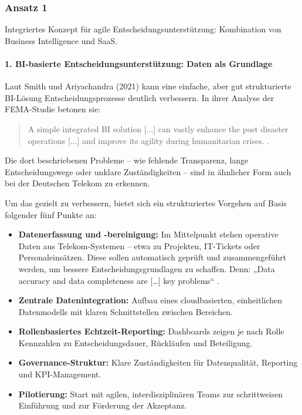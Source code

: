 \documentclass[12pt,a4paper]{article}
\begin{document}
\subsubsection{Ansatz 1}
Integriertes Konzept für agile Entscheidungsunterstützung: Kombination von Business Intelligence und SaaS.

\paragraph{1. BI-basierte Entscheidungsunterstützung: Daten als Grundlage}

Laut Smith und Ariyachandra (2021) kann eine einfache, aber gut strukturierte BI-Lösung Entscheidungsprozesse deutlich verbessern. In ihrer Analyse der FEMA-Studie betonen sie:

\begin{quote}
	A simple integrated BI solution [...] can vastly enhance the post disaster operations [...] and improve its agility during humanitarian crises. \parencite[210]{rahman_achieving_2022}.
\end{quote} 

\noindent Die dort beschriebenen Probleme – wie fehlende Transparenz, lange Entscheidungswege oder unklare Zuständigkeiten – sind in ähnlicher Form auch bei der Deutschen Telekom zu erkennen.

\noindent Um das gezielt zu verbessern, bietet sich ein strukturiertes Vorgehen auf Basis folgender fünf Punkte an:

\begin{itemize}
	\item \textbf{Datenerfassung und -bereinigung:} Im Mittelpunkt stehen operative Daten aus Telekom-Systemen – etwa zu Projekten, IT-Tickets oder Personaleinsätzen. Diese sollen automatisch geprüft und zusammengeführt werden, um bessere Entscheidungsgrundlagen zu schaffen. Denn: „Data accuracy and data completeness are […] key problems“ \parencite[S.~201]{rahman_achieving_2022}.
	
	\item \textbf{Zentrale Datenintegration:} Aufbau eines cloudbasierten, einheitlichen Datenmodells mit klaren Schnittstellen zwischen Bereichen.
	
	\item \textbf{Rollenbasiertes Echtzeit-Reporting:} Dashboards zeigen je nach Rolle Kennzahlen zu Entscheidungsdauer, Rückläufen und Beteiligung.
	
	\item \textbf{Governance-Struktur:} Klare Zuständigkeiten für Datenqualität, Reporting und KPI-Management.
	
	\item \textbf{Pilotierung:} Start mit agilen, interdisziplinären Teams zur schrittweisen Einführung und zur Förderung der Akzeptanz.
\end{itemize}
\end{document}
